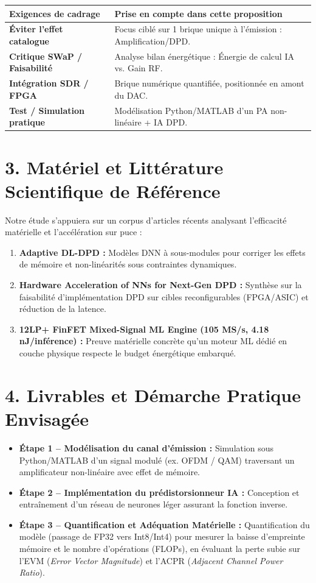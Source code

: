\documentclass[11pt, a4paper]{article}
\begin{document}
\begin{table}[h!]
\centering
\small
\begin{tabular}{@{}ll@{}}
\toprule
\textbf{Exigences de cadrage} & \textbf{Prise en compte dans cette proposition} \\ \midrule
\textbf{Éviter l'effet catalogue} & Focus ciblé sur 1 brique unique à l'émission : Amplification/DPD. \\
\textbf{Critique SWaP / Faisabilité} & Analyse bilan énergétique : Énergie de calcul IA vs. Gain RF. \\
\textbf{Intégration SDR / FPGA} & Brique numérique quantifiée, positionnée en amont du DAC. \\
\textbf{Test / Simulation pratique} & Modélisation Python/MATLAB d'un PA non-linéaire + IA DPD. \\ \bottomrule
\end{tabular}
\end{table}

\section*{3. Matériel et Littérature Scientifique de Référence}
Notre étude s'appuiera sur un corpus d'articles récents analysant l'efficacité matérielle et l'accélération sur puce :
\begin{enumerate}
    \item \textbf{Adaptive DL-DPD :} Modèles DNN à sous-modules pour corriger les effets de mémoire et non-linéarités sous contraintes dynamiques.
    \item \textbf{Hardware Acceleration of NNs for Next-Gen DPD :} Synthèse sur la faisabilité d'implémentation DPD sur cibles reconfigurables (FPGA/ASIC) et réduction de la latence.
    \item \textbf{12LP+ FinFET Mixed-Signal ML Engine (105 MS/s, 4.18 nJ/inférence) :} Preuve matérielle concrète qu'un moteur ML dédié en couche physique respecte le budget énergétique embarqué.
\end{enumerate}

\section*{4. Livrables et Démarche Pratique Envisagée}
\begin{itemize}
    \item \textbf{Étape 1 -- Modélisation du canal d'émission :} Simulation sous Python/MATLAB d'un signal modulé (ex. OFDM / QAM) traversant un amplificateur non-linéaire avec effet de mémoire.
    \item \textbf{Étape 2 -- Implémentation du prédistorsionneur IA :} Conception et entraînement d'un réseau de neurones léger assurant la fonction inverse.
    \item \textbf{Étape 3 -- Quantification et Adéquation Matérielle :} Quantification du modèle (passage de FP32 vers Int8/Int4) pour mesurer la baisse d'empreinte mémoire et le nombre d'opérations (FLOPs), en évaluant la perte subie sur l'EVM (\textit{Error Vector Magnitude}) et l'ACPR (\textit{Adjacent Channel Power Ratio}).
\end{itemize}
\end{document}
